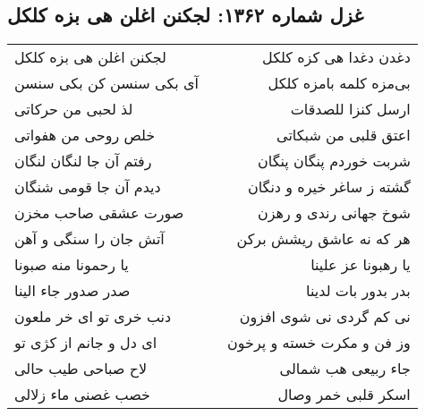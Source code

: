 \begin{center}
\section*{غزل شماره ۱۳۶۲: لجکنن اغلن هی بزه کلکل}
\label{sec:1362}
\begin{longtable}{l p{0.5cm} r}
لجکنن اغلن هی بزه کلکل
&&
دغدن دغدا هی کزه کلکل
\\
آی بکی سنسن کن بکی سنسن
&&
بی‌مزه کلمه بامزه کلکل
\\
لذ لحبی من حرکاتی
&&
ارسل کنزا للصدقات
\\
خلص روحی من هفواتی
&&
اعتق قلبی من شبکاتی
\\
رفتم آن جا لنگان لنگان
&&
شربت خوردم پنگان پنگان
\\
دیدم آن جا قومی شنگان
&&
گشته ز ساغر خیره و دنگان
\\
صورت عشقی صاحب مخزن
&&
شوخ جهانی رندی و رهزن
\\
آتش جان را سنگی و آهن
&&
هر که نه عاشق ریشش برکن
\\
یا رحمونا منه صبونا
&&
یا رهبونا عز علینا
\\
صدر صدور جاء الینا
&&
بدر بدور بات لدینا
\\
دنب خری تو ای خر ملعون
&&
نی کم گردی نی شوی افزون
\\
ای دل و جانم از کژی تو
&&
وز فن و مکرت خسته و پرخون
\\
لاح صباحی طیب حالی
&&
جاء ربیعی هب شمالی
\\
خصب غصنی ماء زلالی
&&
اسکر قلبی خمر وصال
\\
\end{longtable}
\end{center}
